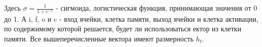 Здесь $\sigma = \frac{1}{1+e^{-x}} $ - сигмоида, логистическая функция, принимающая значения от 0 до 1. А i, f, o и c - вход ячейки, клетка памяти, выход ячейки и клетка активации, по содержимому которой решается, будет ли использоваться ектор из клетки памяти. Все вышеперечисленные вектора имеют размерность $h_t$.

